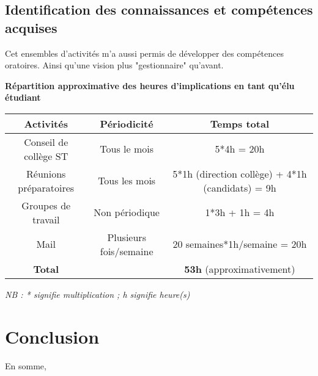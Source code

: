 \documentclass{article}
\begin{document}
\subsection{Identification des connaissances et compétences acquises}



Cet ensembles d'activités m'a aussi permis de développer des compétences oratoires. Ainsi qu'une vision plus "gestionnaire" qu'avant.
\newpage
\begin{center}
\textbf{Répartition approximative des heures d'implications en tant qu'élu étudiant}
\vspace*{10pt}

\begin{tabular}{|c|c|c|}
\hline 
\textbf{Activités} & \textbf{Périodicité} & \textbf{Temps total}\\ 
\hline 
Conseil de collège ST & Tous le mois & 5*4h = 20h \\ 
\hline 
Réunions préparatoires & Tous les mois & 5*1h (direction collège) + 4*1h (candidats) = 9h\\ 
\hline 
Groupes de travail & Non périodique & 1*3h + 1h = 4h\\ 
\hline 
Mail & Plusieurs fois/semaine & 20 semaines*1h/semaine = 20h\\ 
\hline 
\textbf{Total} &  & \textbf{53h} (approximativement) \\ 
\hline 
\end{tabular} 
\end{center}
\textit{NB : * signifie multiplication ; h signifie heure(s)}

\section*{Conclusion}
En somme, 
\end{document}
